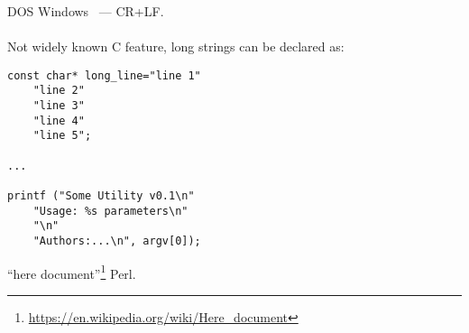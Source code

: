  DOS  Windows ~--- CR+LF.

\paragraph{}
\label{heredoc}
{Not widely known C feature, long strings can be declared as}:

\begin{lstlisting}
const char* long_line="line 1"
	"line 2"
	"line 3"
	"line 4"
	"line 5";

...

printf ("Some Utility v0.1\n"
	"Usage: %s parameters\n"
	"\n"
	"Authors:...\n", argv[0]);
\end{lstlisting}

``here document''\footnote{\url{https://en.wikipedia.org/wiki/Here_document}} 
 \AndENRU Perl.

